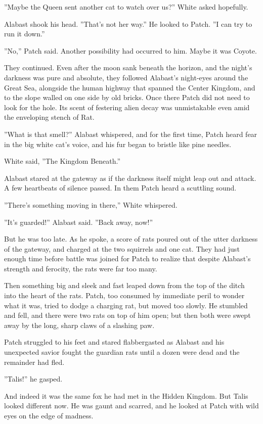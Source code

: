 \documentclass[11pt]{article}
\begin{document}
 ''Maybe the Queen sent another cat to watch over us?'' White asked hopefully.\par
 Alabast shook his head. ''That's not her way.'' He looked to Patch. ''I can try to run it down.''\par
 ''No,'' Patch said. Another possibility had occurred to him. Maybe it was Coyote.\par
 They continued. Even after the moon sank beneath the horizon, and the night's darkness was pure and absolute, they followed Alabast's night-eyes around the Great Sea, alongside the human highway that spanned the Center Kingdom, and to the slope walled on one side by old bricks. Once there Patch did not need to look for the hole. Its scent of festering alien decay was unmistakable even amid the enveloping stench of Rat.\par
 ''What is that smell?'' Alabast whispered, and for the first time, Patch heard fear in the big white cat's voice, and his fur began to bristle like pine needles.\par
 White said, ''The Kingdom Beneath.''\par
 Alabast stared at the gateway as if the darkness itself might leap out and attack. A few heartbeats of silence passed. In them Patch heard a scuttling sound.\par
 ''There's something moving in there,'' White whispered.\par
 ''It's guarded!'' Alabast said. ''Back away, now!''\par
 But he was too late. As he spoke, a score of rats poured out of the utter darkness of the gateway, and charged at the two squirrels and one cat. They had just enough time before battle was joined for Patch to realize that despite Alabast's strength and ferocity, the rats were far too many.\par
 Then something big and sleek and fast leaped down from the top of the ditch into the heart of the rats. Patch, too consumed by immediate peril to wonder what it was, tried to dodge a charging rat, but moved too slowly. He stumbled and fell, and there were two rats on top of him open; but then both were swept away by the long, sharp claws of a slashing paw.\par
Patch struggled to his feet and stared flabbergasted as Alabast and his unexpected savior fought the guardian rats until a dozen were dead and the remainder had fled.\par
 ''Talis!'' he gasped.\par
 And indeed it was the same fox he had met in the Hidden Kingdom. But Talis looked different now. He was gaunt and scarred, and he looked at Patch with wild eyes on the edge of madness.\par
\end{document}
